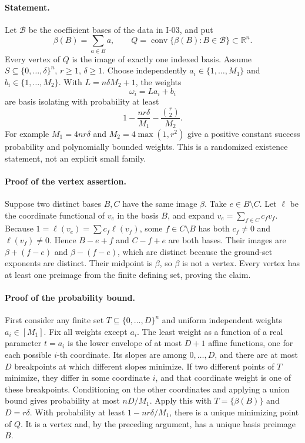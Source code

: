 \paragraph{Statement.}
Let $\mathcal B$ be the coefficient bases of the data in I-03, and put
\[
 \beta(B)=\sum_{a\in B}a,\qquad
 Q=\operatorname{conv}\{\beta(B):B\in\mathcal B\}\subset\mathbb R^n.
\]
Every vertex of $Q$ is the image of exactly one indexed basis.
Assume $S\subseteq\{0,\ldots,\delta\}^{n}$, $r\ge1$, $\delta\ge1$.
Choose independently
$a_i\in\{1,\ldots,M_1\}$ and $b_i\in\{1,\ldots,M_2\}$.
With $L=n\delta M_2+1$, the weights
\[
 \omega_i=L a_i+b_i
\tag{I.4}
\]
are basis isolating with probability at least
\[
 1-\frac{nr\delta}{M_1}-\frac{\binom r2}{M_2}.
\tag{I.5}
\]
For example $M_1=4nr\delta$ and $M_2=4\max(1,r^2)$ give a positive
constant success probability and polynomially bounded weights.  This
is a randomized existence statement, not an explicit small family.

\paragraph{Proof of the vertex assertion.}
Suppose two distinct bases $B,C$ have the same image $\beta$.
Take $e\in B\setminus C$.  Let $\ell$ be the coordinate functional
of $v_e$ in the basis $B$, and expand $v_e=\sum_{f\in C}c_fv_f$.
Because $1=\ell(v_e)=\sum c_f\ell(v_f)$, some
$f\in C\setminus B$ has both $c_f\ne0$ and $\ell(v_f)\ne0$.
Hence $B-e+f$ and $C-f+e$ are both bases.  Their images are
$\beta+(f-e)$ and $\beta-(f-e)$, which are distinct because the
ground-set exponents are distinct.  Their midpoint is $\beta$,
so $\beta$ is not a vertex.  Every vertex has at least one preimage
from the finite defining set, proving the claim.

\paragraph{Proof of the probability bound.}
First consider any finite set $T\subseteq\{0,\ldots,D\}^{n}$ and
uniform independent weights $a_i\in[M_1]$.  Fix all weights except
$a_i$.  The least weight as a function of a real parameter $t=a_i$
is the lower envelope of at most $D+1$ affine functions, one for
each possible $i$-th coordinate.  Its slopes are among
$0,\ldots,D$, and there are at most $D$ breakpoints at which
different slopes minimize.  If two different points of $T$ minimize,
they differ in some coordinate $i$, and that coordinate weight is
one of these breakpoints.  Conditioning on the other coordinates
and applying a union bound gives probability at most $nD/M_1$.
Apply this with $T=\{\beta(B)\}$ and $D=r\delta$.
With probability at least $1-nr\delta/M_1$, there is a unique
minimizing point of $Q$.  It is a vertex and, by the preceding
argument, has a unique basis preimage $B$.

